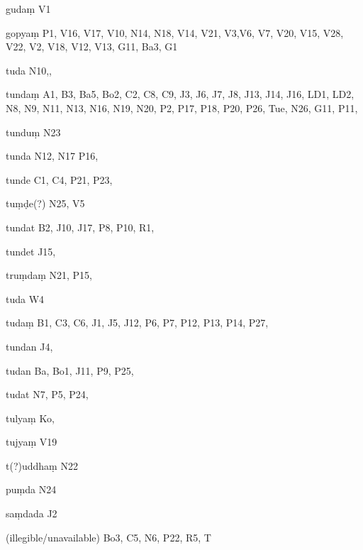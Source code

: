 \begin{ekdosis}
\begin{marma}[hp01_055]
\begin{marma}[hp02_009]
\begin{marma}[hp02_011]
\begin{marma}[hp02_33b]
\begin{description}
    \end{description}
 \end{marma}

 \begin{marma}[hp02_34b]
\item[gudaṃ] V1
\item[gopyaṃ] P1, V16, V17, V10, N14, N18, V14, V21, V3,V6, V7, V20, V15, V28, V22, V2, V18, V12, V13, G11, Ba3, G1
\item[tuda] N10,,
\item[tundaṃ] A1, B3, Ba5, Bo2, C2, C8, C9, J3, J6, J7, J8, J13, J14, J16, LD1, LD2, N8, N9, N11, N13, N16, N19, N20, P2, P17, P18, P20, P26, Tue, N26, G11, P11, 
\item[tunduṃ] N23
\item[tunda] N12, N17 P16, 
\item[tunde] C1, C4, P21, P23,  
\item[tuṃḍe(?)] N25, V5
\item[tundat] B2, J10, J17, P8, P10, R1, 
\item[tundet] J15, 
\item[truṃdaṃ] N21, P15, 
\item[tuda] W4
\item[tudaṃ] B1, C3, C6, J1, J5, J12, P6, P7, P12, P13, P14, P27, 	
\item[tundan] J4,
\item[tudan] Ba, Bo1, J11, P9, P25,  
\item[tudat] N7, P5, P24, 
\item[tulyaṃ] Ko,
\item[tujyaṃ] V19
\item[t(?)uddhaṃ] N22
\item[puṃda] N24
\item[saṃdada] J2
\item[(illegible/unavailable)] Bo3, C5, N6, P22, R5, T
  \begin{description}

    \end{description}
 \end{marma}


\end{marma}
\end{marma}
\end{marma}
\end{ekdosis}
